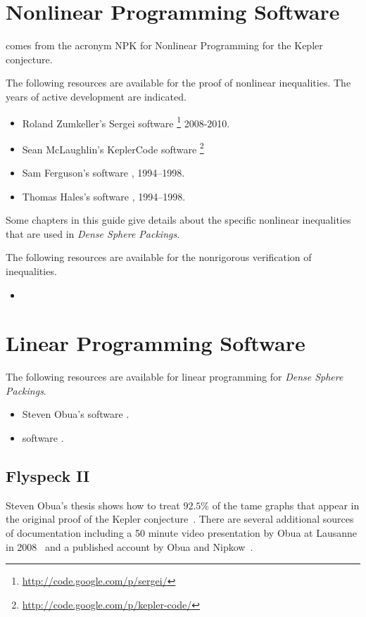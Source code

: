 
\chapter{Nonlinear Programming Software}

 comes from the acronym NPK for Nonlinear Programming for the Kepler conjecture.

The following resources are available for the proof of nonlinear inequalities.  The years of active development are indicated.

\begin{itemize}
\item Roland Zumkeller's 
Sergei software%
\footnote{\url{http://code.google.com/p/sergei/}} %
 2008-2010.
\item Sean McLaughlin's KeplerCode software%
\footnote{\url{http://code.google.com/p/kepler-code/}}%
\item Sam Ferguson's software \url{}, 1994--1998.
\item Thomas Hales's software \url{}, 1994--1998.
\end{itemize}

Some chapters in this guide give details about the specific nonlinear inequalities that are
used in {\it Dense Sphere Packings}.

The following resources are available for the nonrigorous verification of inequalities.

\begin{itemize}
\item 
\end{itemize}

\chapter{Linear Programming Software}

The following resources are available for linear programming for {\it Dense Sphere Packings}.

\begin{itemize}
\item Steven Obua's software \url{}.
\item {} software \url{}.
\end{itemize}

\section{Flyspeck II}

Steven Obua's thesis shows how to treat $92.5\%$ of the tame graphs
that appear in the original proof of the Kepler conjecture~\cite{obua:phd}.  There are
several additional sources of documentation including a 50 minute video
presentation by Obua at Lausanne in 2008~\cite{obua:2008:video} and a
published account by Obua and Nipkow~\cite{obua-nipkow:2009}.

